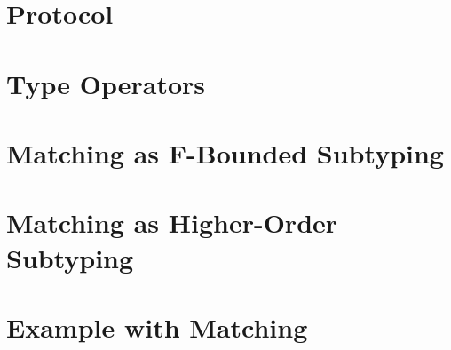 \section{Protocol}

\section{Type Operators}

\section{Matching as F-Bounded Subtyping}

\section{Matching as Higher-Order Subtyping}

\section{Example with Matching}


